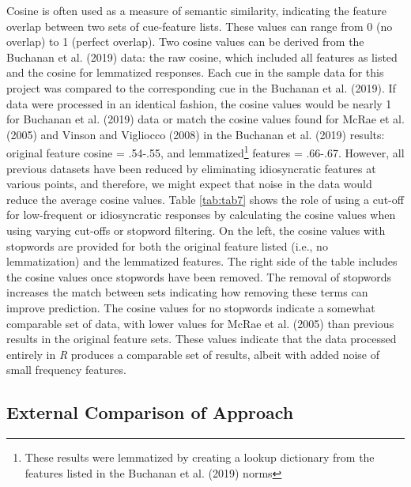 \documentclass[man]{apa6}
\let\rmarkdownfootnote\footnote%
\def\footnote{\protect\rmarkdownfootnote}
\begin{document}
Cosine is often used as a measure of semantic similarity, indicating the feature overlap between two sets of cue-feature lists. These values can range from 0 (no overlap) to 1 (perfect overlap). Two cosine values can be derived from the Buchanan et al. (2019) data: the raw cosine, which included all features as listed and the cosine for lemmatized responses. Each cue in the sample data for this project was compared to the corresponding cue in the Buchanan et al. (2019). If data were processed in an identical fashion, the cosine values would be nearly 1 for Buchanan et al. (2019) data or match the cosine values found for McRae et al. (2005) and Vinson and Vigliocco (2008) in the Buchanan et al. (2019) results: original feature cosine = .54-.55, and lemmatized\footnote{These results were lemmatized by creating a lookup dictionary from the features listed in the Buchanan et al. (2019) norms} features = .66-.67. However, all previous datasets have been reduced by eliminating idiosyncratic features at various points, and therefore, we might expect that noise in the data would reduce the average cosine values. Table \ref{tab:tab7} shows the role of using a cut-off for low-frequent or idiosyncratic responses by calculating the cosine values when using varying cut-offs or stopword filtering. On the left, the cosine values with stopwords are provided for both the original feature listed (i.e., no lemmatization) and the lemmatized features. The right side of the table includes the cosine values once stopwords have been removed. The removal of stopwords increases the match between sets indicating how removing these terms can improve prediction. The cosine values for no stopwords indicate a somewhat comparable set of data, with lower values for McRae et al. (2005) than previous results in the original feature sets. These values indicate that the data processed entirely in \emph{R} produces a comparable set of results, albeit with added noise of small frequency features.

\hypertarget{external-comparison-of-approach}{%
\subsection{External Comparison of Approach}\label{external-comparison-of-approach}}
\end{document}
